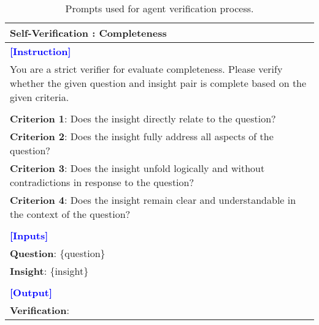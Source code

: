 \begin{table*}[htbp]
\begin{tabularx}{\textwidth}{X}
\midrule

\textbf{Self-Verification : Completeness} \\\hline
\textcolor{blue}{\textbf{[Instruction]}} \\
You are a strict verifier for evaluate completeness. Please verify whether the given question and insight pair is complete based on the given criteria. \\\\
\textbf{Criterion 1}: Does the insight directly relate to the question? \\
\textbf{Criterion 2}: Does the insight fully address all aspects of the question? \\
\textbf{Criterion 3}: Does the insight unfold logically and without contradictions in response to the question? \\
\textbf{Criterion 4}: Does the insight remain clear and understandable in the context of the question? \\\\
\textcolor{blue}{\textbf{[Inputs]}} \\
\textbf{Question}: \{question\} \\
\textbf{Insight}: \{insight\} \\\\
\textcolor{blue}{\textbf{[Output]}} \\
\textbf{Verification}: \\

\bottomrule
\end{tabularx}
\caption{Prompts used for agent verification process.}
\label{pmt:step4_1}
\end{table*}